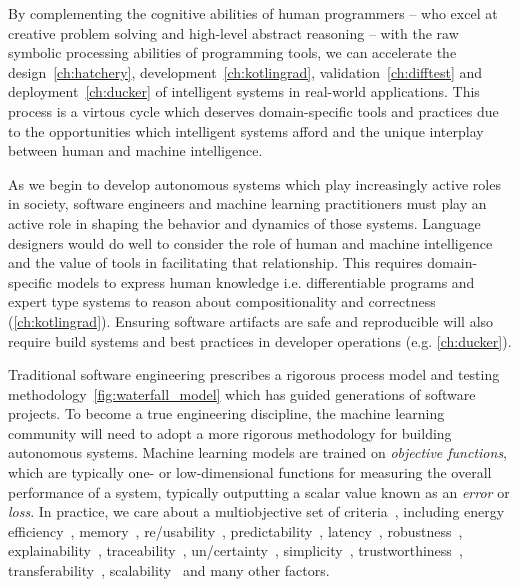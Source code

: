 By complementing the cognitive abilities of human programmers -- who excel at creative problem solving and high-level abstract reasoning -- with the raw symbolic processing abilities of programming tools, we can accelerate the design~\autoref{ch:hatchery}, development~\autoref{ch:kotlingrad}, validation~\autoref{ch:difftest} and deployment~\autoref{ch:ducker} of intelligent systems in real-world applications. This process is a virtous cycle which deserves domain-specific tools and practices due to the opportunities which intelligent systems afford and the unique interplay between human and machine intelligence.

As we begin to develop autonomous systems which play increasingly active roles in society, software engineers and machine learning practitioners must play an active role in shaping the behavior and dynamics of those systems. Language designers would do well to consider the role of human and machine intelligence and the value of tools in facilitating that relationship. This requires domain-specific models to express human knowledge i.e. differentiable programs and expert type systems to reason about compositionality and correctness (\autoref{ch:kotlingrad}). Ensuring software artifacts are safe and reproducible will also require build systems and best practices in developer operations (e.g. \autoref{ch:ducker}).

Traditional software engineering prescribes a rigorous process model and testing methodology~\autoref{fig:waterfall_model} which has guided generations of software projects. To become a true engineering discipline, the machine learning community will need to adopt a more rigorous methodology for building autonomous systems. Machine learning models are trained on \textit{objective functions}, which are typically one- or low-dimensional functions for measuring the overall performance of a system, typically outputting a scalar value known as an \textit{error} or \textit{loss}. In practice, we care about a multiobjective set of criteria~\citep{censi2015mathematical}, including energy efficiency~\citep{paull2010novel}, memory~\citep{memory2013mitliagkas}, re/usability~\citep{breuleux2017automatic,deleu2019torchmeta}, predictability~\citep{turner2017well}, latency~\citep{ravanelli2018twin}, robustness~\citep{pineau2003policy}, explainability~\citep{turner2016model}, traceability~\citep{guo2017semantically, tsirigotis2018orion}, un/certainty~\citep{diaz2018interactive}, simplicity~\citep{kastner2019representation}, trustworthiness~\citep{xu2017efficient}, transferability~\citep{mehta2019active}, scalability~\citep{luan2019break} and many other factors.

